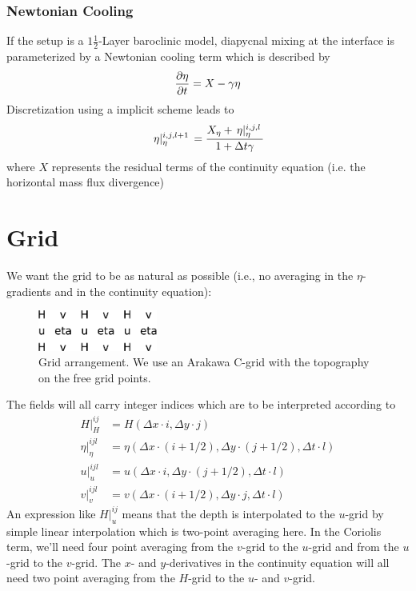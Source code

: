 \documentclass[a4paper]{article}
\begin{document}
\subsubsection{Newtonian Cooling}
If the setup is a $1\frac12$-Layer baroclinic model, diapycnal mixing at the interface is parameterized by a Newtonian cooling term which is described by
\begin{equation}
	\frac{\partial {\eta}}{\partial {t}} = X-\gamma\eta
\end{equation}
Discretization using a implicit scheme leads to
\begin{equation}
	\,{\eta}\vert_{\eta}^{{i},{j},{l+1}}\, = \frac{X_\eta + \,{\eta}\vert_{\eta}^{{i},{j},{l}}\,}{1+\Delta t\gamma}
\end{equation}
where $X$ represents the residual terms of the continuity equation (i.e. the horizontal mass flux divergence)

\section{Grid}
We want the grid to be as natural as possible (i.e., no averaging in the 
$\eta$-gradients and in the continuity equation):
\begin{figure}[h]
  \begin{center}
    \includegraphics[width=0.35\textwidth]{images/grid}
  \end{center}
  \caption{Grid arrangement. We use an Arakawa C-grid with the topography
    on the free grid points.  }
\end{figure}
The fields will all carry integer indices which are to be interpreted according to
\begin{align}
  H|_H^{ij} & = H(\Delta x \cdot i, \Delta y \cdot j) \\
  \eta|_\eta^{ijl} & = \eta(\Delta x \cdot (i+1/2), \Delta y \cdot (j+1/2), \Delta t \cdot l) \\
  u|_u^{ijl} & = u(\Delta x \cdot i, \Delta y \cdot (j+1/2), \Delta t \cdot l) \\
  v|_v^{ijl} & = v(\Delta x \cdot (i+1/2), \Delta y \cdot j, \Delta t \cdot l)
\end{align}
An expression like $H|_u^{ij}$ means that the depth is interpolated to the $u$-grid
by simple linear interpolation which is two-point averaging here. In the Coriolis term, 
we'll need four point averaging from the $v$-grid to the $u$-grid and from the $u$-grid
to the $v$-grid. The $x$- and $y$-derivatives in the continuity equation will all need 
two point averaging from the $H$-grid to the $u$- and $v$-grid.
\end{document}
